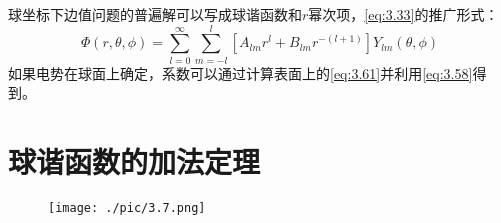 \documentclass[12pt]{book}
\numberwithin{equation}{chapter}
\numberwithin{figure}{chapter}
\numberwithin{footnote}{page}
\begin{document}
球坐标下边值问题的普遍解可以写成球谐函数和$r$幂次项，\autoref{eq:3.33}的推广形式：
\begin{equation}\label{eq:3.61}
    \Phi(r,\theta,\phi)=\sum_{l=0}^\infty\sum_{m=-l}^l[A_{lm}r^l+B_{lm}r^{-(l+1)}]Y_{lm}(\theta,\phi)
\end{equation}
如果电势在球面上确定，系数可以通过计算表面上的\autoref{eq:3.61}并利用\autoref{eq:3.58}得到。

\section{球谐函数的加法定理}\label{sec:3.6}

\begin{figure}[!ht]
    \centering
    \texttt{[image: ./pic/3.7.png]}
    \captionsetup{justification=raggedright, singlelinecheck=false}
    \caption{}
    \label{fig:3.7}
\end{figure}
\end{document}
